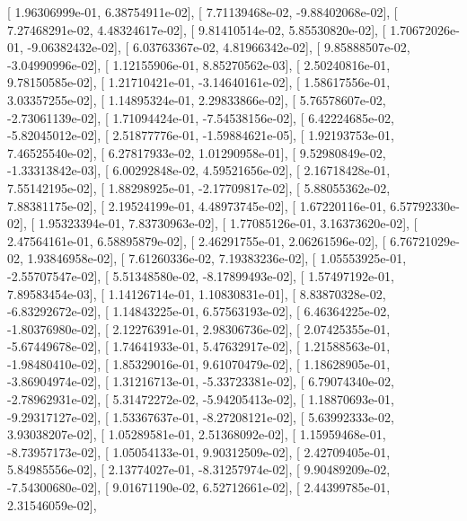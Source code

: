 \documentclass{article}
\begin{document}
       [  1.96306999e-01,   6.38754911e-02],
       [  7.71139468e-02,  -9.88402068e-02],
       [  7.27468291e-02,   4.48324617e-02],
       [  9.81410514e-02,   5.85530820e-02],
       [  1.70672026e-01,  -9.06382432e-02],
       [  6.03763367e-02,   4.81966342e-02],
       [  9.85888507e-02,  -3.04990996e-02],
       [  1.12155906e-01,   8.85270562e-03],
       [  2.50240816e-01,   9.78150585e-02],
       [  1.21710421e-01,  -3.14640161e-02],
       [  1.58617556e-01,   3.03357255e-02],
       [  1.14895324e-01,   2.29833866e-02],
       [  5.76578607e-02,  -2.73061139e-02],
       [  1.71094424e-01,  -7.54538156e-02],
       [  6.42224685e-02,  -5.82045012e-02],
       [  2.51877776e-01,  -1.59884621e-05],
       [  1.92193753e-01,   7.46525540e-02],
       [  6.27817933e-02,   1.01290958e-01],
       [  9.52980849e-02,  -1.33313842e-03],
       [  6.00292848e-02,   4.59521656e-02],
       [  2.16718428e-01,   7.55142195e-02],
       [  1.88298925e-01,  -2.17709817e-02],
       [  5.88055362e-02,   7.88381175e-02],
       [  2.19524199e-01,   4.48973745e-02],
       [  1.67220116e-01,   6.57792330e-02],
       [  1.95323394e-01,   7.83730963e-02],
       [  1.77085126e-01,   3.16373620e-02],
       [  2.47564161e-01,   6.58895879e-02],
       [  2.46291755e-01,   2.06261596e-02],
       [  6.76721029e-02,   1.93846958e-02],
       [  7.61260336e-02,   7.19383236e-02],
       [  1.05553925e-01,  -2.55707547e-02],
       [  5.51348580e-02,  -8.17899493e-02],
       [  1.57497192e-01,   7.89583454e-03],
       [  1.14126714e-01,   1.10830831e-01],
       [  8.83870328e-02,  -6.83292672e-02],
       [  1.14843225e-01,   6.57563193e-02],
       [  6.46364225e-02,  -1.80376980e-02],
       [  2.12276391e-01,   2.98306736e-02],
       [  2.07425355e-01,  -5.67449678e-02],
       [  1.74641933e-01,   5.47632917e-02],
       [  1.21588563e-01,  -1.98480410e-02],
       [  1.85329016e-01,   9.61070479e-02],
       [  1.18628905e-01,  -3.86904974e-02],
       [  1.31216713e-01,  -5.33723381e-02],
       [  6.79074340e-02,  -2.78962931e-02],
       [  5.31472272e-02,  -5.94205413e-02],
       [  1.18870693e-01,  -9.29317127e-02],
       [  1.53367637e-01,  -8.27208121e-02],
       [  5.63992333e-02,   3.93038207e-02],
       [  1.05289581e-01,   2.51368092e-02],
       [  1.15959468e-01,  -8.73957173e-02],
       [  1.05054133e-01,   9.90312509e-02],
       [  2.42709405e-01,   5.84985556e-02],
       [  2.13774027e-01,  -8.31257974e-02],
       [  9.90489209e-02,  -7.54300680e-02],
       [  9.01671190e-02,   6.52712661e-02],
       [  2.44399785e-01,   2.31546059e-02],
\end{document}
